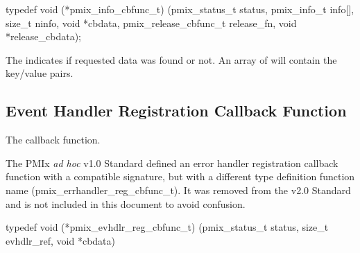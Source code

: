 \cspecificstart
\begin{codepar}
typedef void (*pmix_info_cbfunc_t)
    (pmix_status_t status,
     pmix_info_t info[], size_t ninfo,
     void *cbdata,
     pmix_release_cbfunc_t release_fn,
     void *release_cbdata);
\end{codepar}
\cspecificend

\begin{arglist}
\end{arglist}


\descr

The  indicates if requested data was found or not.
An array of  will contain the key/value pairs.


\subsection{Event Handler Registration Callback Function}

The  callback function.

\adviceuserstart
The \ac{PMIx} \textit{ad hoc} v1.0 Standard defined an error handler registration callback function with a compatible signature, but with a different type definition function name (pmix_errhandler_reg_cbfunc_t). It was removed from the v2.0 Standard and is not included in this document to avoid confusion.
\adviceuserend

\cspecificstart
\begin{codepar}
typedef void (*pmix_evhdlr_reg_cbfunc_t)
    (pmix_status_t status,
     size_t evhdlr_ref,
     void *cbdata)
\end{codepar}
\cspecificend

\begin{arglist}
\end{arglist}


